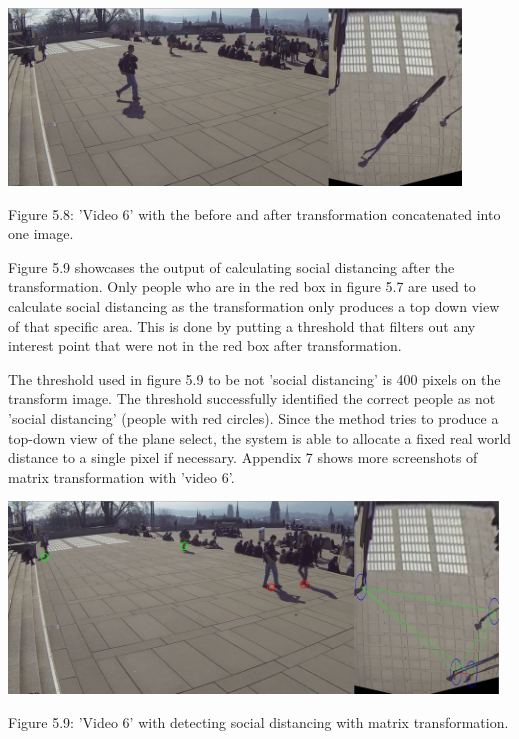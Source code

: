 \documentclass[12pt]{report}
\begin{document}
\begin{center}
	\includegraphics[width=120mm]{./images/appendix/ConcatenateImages.JPG}
	
	{\footnotesize Figure 5.8: 'Video 6' with the before and after transformation concatenated into one image.}
\end{center}

Figure 5.9 showcases the output of calculating social distancing after the transformation. Only people who are in the red box in figure 5.7 are used to calculate social distancing as the transformation only produces a top down view of that specific area. This is done by putting a threshold that filters out any interest point that were not in the red box after transformation. 

\vspace{2mm}

The threshold used in figure 5.9 to be not 'social distancing' is 400 pixels on the transform image. The threshold successfully identified the correct people as not 'social distancing' (people with red circles). Since the method tries to produce a top-down view of the plane select, the system is able to allocate a fixed real world distance to a single pixel if necessary. Appendix 7 shows more screenshots of matrix transformation with 'video 6'.


\begin{center}
	\includegraphics[width=130mm]{./images/appendix/MatrixTransExample3.JPG}
	
	{\footnotesize Figure 5.9: 'Video 6' with detecting social distancing with matrix transformation.}
\end{center}
\end{document}
